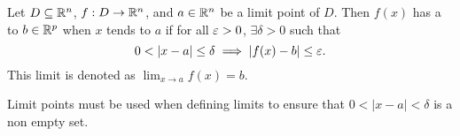 \documentclass[../main.tex]{subfiles}
\begin{document}
\begin{definition}[Limit]
    Let $D \subseteq \mathbb{R}^n$, $f : D \to \mathbb{R}^n$, and $a \in \mathbb{R}^n$ be a limit point of $D$. Then $f(x)$ has a  to $b \in \mathbb{R}^p$ when $x$ tends to $a$ if for all $\varepsilon > 0$, $\exists \delta > 0$ such that
    \[
        0 < |x - a| \leq \delta \implies |f(x) - b| \leq \varepsilon
    .\]
    This limit is denoted as $\displaystyle \lim_{x \to a} f(x) = b$.
\end{definition}

\begin{remark}
    Limit points must be used when defining limits to ensure that $0 < |x - a| < \delta$ is a non empty set.
\end{remark}
\end{document}
